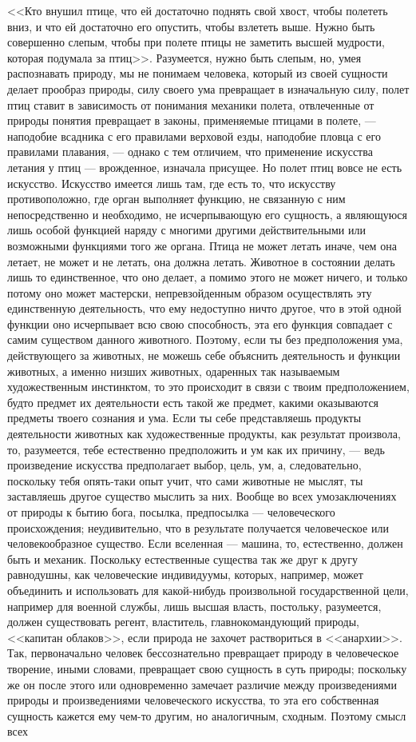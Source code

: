 \documentclass[12pt,oneside]{book}
\begin{document}
<<Кто внушил птице, что ей достаточно поднять свой хвост, чтобы полететь вниз, и что ей достаточно его опустить, чтобы взлететь выше. Нужно быть совершенно слепым, чтобы при полете птицы не заметить высшей мудрости, которая подумала за птиц>>. Разумеется, нужно быть слепым, но, умея распознавать природу, мы не понимаем человека, который из своей сущности делает прообраз природы, силу своего ума превращает в изначальную силу, полет птиц ставит в зависимость от понимания механики полета, отвлеченные от природы понятия превращает в законы, применяемые птицами в полете, --- наподобие всадника с его правилами верховой езды, наподобие пловца с его правилами плавания, --- однако с тем отличием, что применение искусства летания у птиц --- врожденное, изначала присущее. Но полет птиц вовсе не есть искусство. Искусство имеется лишь там, где есть то, что искусству противоположно, где орган выполняет функцию, не связанную с ним непосредственно и необходимо, не исчерпывающую его сущность, а являющуюся лишь особой функцией наряду с многими другими действительными или возможными функциями того же органа. Птица не может летать иначе, чем она летает, не может и не летать, она должна летать. Животное в состоянии делать лишь то единственное, что оно делает, а помимо этого не может ничего, и только потому оно может мастерски, непревзойденным образом осуществлять эту единственную деятельность, что ему недоступно ничто другое, что в этой одной функции оно исчерпывает всю свою способность, эта его функция совпадает с самим существом данного животного. Поэтому, если ты без предположения ума, действующего за животных, не можешь себе объяснить деятельность и функции животных, а именно низших животных, одаренных так называемым художественным инстинктом, то это происходит в связи с твоим предположением, будто предмет их деятельности есть такой же предмет, какими оказываются предметы твоего сознания и ума. Если ты себе представляешь продукты деятельности животных как художественные продукты, как результат произвола, то, разумеется, тебе естественно предположить и ум как их причину, --- ведь произведение искусства предполагает выбор, цель, ум, а, следовательно, поскольку тебя опять-таки опыт учит, что сами животные не мыслят, ты заставляешь другое существо мыслить за них. Вообще во всех умозаключениях от природы к бытию бога, посылка, предпосылка --- человеческого происхождения; неудивительно, что в результате получается человеческое или человекообразное существо. Если вселенная --- машина, то, естественно, должен быть и механик. Поскольку естественные существа так же друг к другу равнодушны, как человеческие индивидуумы, которых, например, может объединить и использовать для какой-нибудь произвольной государственной цели, например для военной службы, лишь высшая власть, постольку, разумеется, должен существовать регент, властитель, главнокомандующий природы, <<капитан облаков>>, если природа не захочет раствориться в <<анархии>>. Так, первоначально человек бессознательно превращает природу в человеческое творение, иными словами, превращает свою сущность в суть природы; поскольку же он после этого или одновременно замечает различие между произведениями природы и произведениями человеческого искусства, то эта его собственная сущность кажется ему чем-то другим, но аналогичным, сходным. Поэтому смысл всех 
\end{document}
